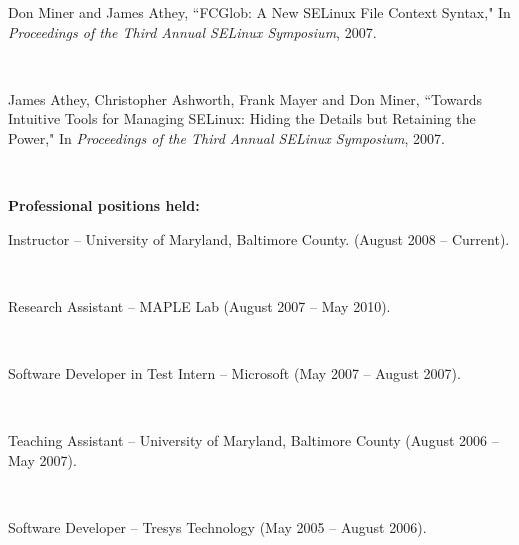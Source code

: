 \begin{titlepage}
\begin{flushleft}
\begin{singlespace}
  {\vspace{5pt}}
  {\hspace{0.4in}} \parbox[t]{5.5in}{ Don Miner and James Athey, ``FCGlob: A New SELinux File Context Syntax," In {\em Proceedings of the Third Annual SELinux Symposium}, 2007.}\\
  {\vspace{5pt}}
   {\hspace{0.4in}} \parbox[t]{5.5in}{ James Athey, Christopher Ashworth, Frank Mayer and Don Miner, ``Towards Intuitive Tools for Managing SELinux: Hiding the Details but Retaining the Power," In {\em Proceedings of the Third Annual SELinux Symposium}, 2007.}\\
  {\vspace{5pt}}

  \end{singlespace} 

\pagebreak


	{\bf Professional positions held:}\\
	\begin{singlespace}
	{\hspace{0.4in}}\parbox[t]{5.5in}{Instructor -- University of Maryland, Baltimore County. (August 2008 -- Current).}\\
	{\vspace{5pt}}
	{\hspace{0.4in}}\parbox[t]{5.5in}{Research Assistant -- MAPLE Lab  (August 2007 -- May 2010).}\\
	{\vspace{5pt}}
	{\hspace{0.4in}}\parbox[t]{5.5in}{Software Developer in Test Intern -- Microsoft  (May 2007 -- August 2007).}\\
	{\vspace{5pt}}
	{\hspace{0.4in}}\parbox[t]{5.5in}{Teaching Assistant -- University of Maryland, Baltimore County  (August 2006 -- May 2007).}\\
	{\vspace{5pt}}
	{\hspace{0.4in}}\parbox[t]{5.5in}{Software Developer -- Tresys Technology  (May 2005 -- August 2006).}\\

	\end{singlespace}
\end{flushleft}
       
\end{titlepage}
\par\vfil


